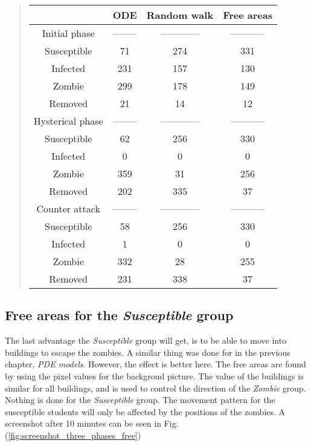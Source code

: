 \documentclass[%
twoside,                 %
final,                   %
chapterprefix=true,      %
open=right               %
10pt]{book}
\begin{document}
\label{table:compare_ODE_random}

\begin{quote}
\begin{tabular}{cccc}
\hline
\multicolumn{1}{c}{  } & \multicolumn{1}{c}{ ODE } & \multicolumn{1}{c}{ Random walk } & \multicolumn{1}{c}{ Free areas } \\
\hline
Initial phase    & -------- & ------------ & ----------- \\
\hline
Susceptible      & 71       & 274          & 331         \\
Infected         & 231      & 157          & 130         \\
Zombie           & 299      & 178          & 149         \\
Removed          & 21       & 14           & 12          \\
\hline
Hysterical phase & -------- & ------------ & ----------- \\
\hline
Susceptible      & 62       & 256          & 330         \\
Infected         & 0        & 0            & 0           \\
Zombie           & 359      & 31           & 256         \\
Removed          & 202      & 335          & 37          \\
\hline
Counter attack   & -------- & ------------ & ----------- \\
\hline
Susceptible      & 58       & 256          & 330         \\
Infected         & 1        & 0            & 0           \\
Zombie           & 332      & 28           & 255         \\
Removed          & 231      & 338          & 37          \\
\hline
\end{tabular}
\end{quote}

\noindent




\subsection{Free areas for the \emph{Susceptible} group}
The last advantage the \emph{Susceptible} group will get, is to be able to move into buildings to escape the zombies. A similar thing was done for in the previous chapter, \emph{PDE models}. However, the effect is better here. The free areas are found by using the pixel values for the backgroud picture. The value of the buildings is similar for all buildings, and is used to control the direction of the \emph{Zombie} group. Nothing is done for the \emph{Susceptible} group. The movement pattern for the susceptible students will only be affected by the positions of the zombies. A screenshot after 10 minutes can be seen in Fig.(\ref{fig:screenshot_three_phases_free})
\end{document}
